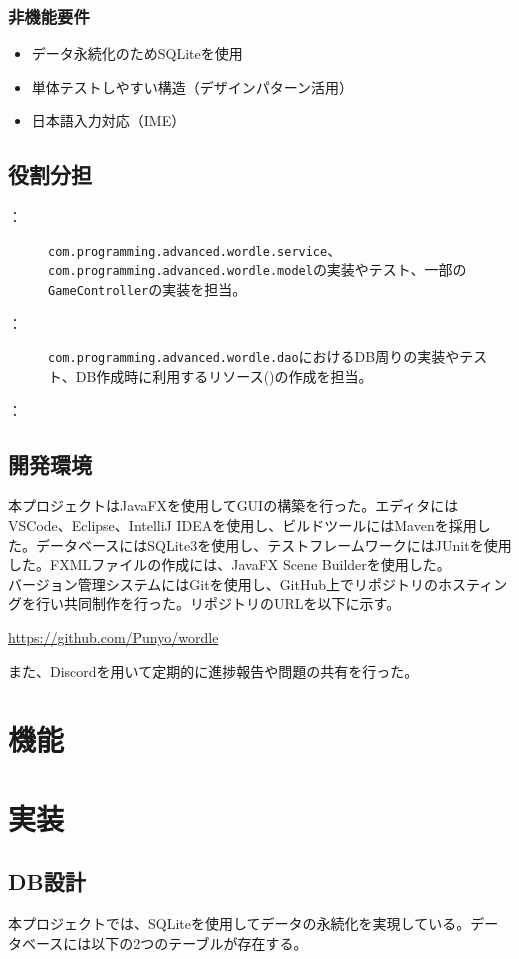 \documentclass[a4j]{ujarticle}
\begin{document}
\subsubsection{非機能要件}
\begin{itemize}
  \item データ永続化のためSQLiteを使用
  \item 単体テストしやすい構造（デザインパターン活用）
  \item 日本語入力対応（IME）
\end{itemize}
\subsection{役割分担}
\begin{description}
  \item[：]\texttt{com.programming.advanced.wordle.service}、\texttt{com.programming.advanced.wordle.model}の実装やテスト、一部の\texttt{GameController}の実装を担当。
  \item[：]\texttt{com.programming.advanced.wordle.dao}におけるDB周りの実装やテスト、DB作成時に利用するリソース()の作成を担当。
  \item[：] 
\end{description}
\subsection{開発環境}
本プロジェクトはJavaFXを使用してGUIの構築を行った。エディタにはVSCode、Eclipse、IntelliJ IDEAを使用し、ビルドツールにはMavenを採用した。データベースにはSQLite3を使用し、テストフレームワークにはJUnitを使用した。FXMLファイルの作成には、JavaFX Scene Builderを使用した。\\
バージョン管理システムにはGitを使用し、GitHub上でリポジトリのホスティングを行い共同制作を行った。リポジトリのURLを以下に示す。
\begin{center}
  \url{https://github.com/Punyo/wordle}
\end{center}
また、Discordを用いて定期的に進捗報告や問題の共有を行った。
\section{機能}
\section{実装}
\subsection{DB設計}
本プロジェクトでは、SQLiteを使用してデータの永続化を実現している。データベースには以下の2つのテーブルが存在する。
\end{document}
